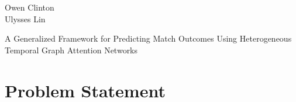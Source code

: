 \documentclass{article}
\begin{document}
\begin{flushleft}
Owen Clinton
\\Ulysses Lin
\begin{center}
\LARGE A Generalized Framework for Predicting Match Outcomes Using Heterogeneous Temporal Graph Attention Networks
\end{center}
\end{flushleft}
\section*{Problem Statement}
\end{document}
